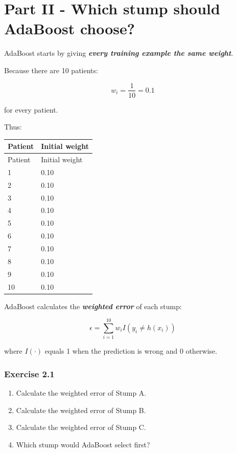 \documentclass{course_sheet}
\begin{document}
\section*{Part II - Which stump should AdaBoost choose?}
AdaBoost starts by giving \textbf{\textit{every training example the same weight}}.

Because there are 10 patients:

\[
w_i=\frac{1}{10}=0.1
\]

for every patient.

Thus:

\begingroup
\small
\setlength{\tabcolsep}{4pt}
\begin{longtable}{l|l}
Patient & Initial weight \\[1.5pt]
\hline
\endfirsthead
Patient & Initial weight \\[1.5pt]
\hline
\endhead
1 & 0.10 \\[1.5pt]
2 & 0.10 \\[1.5pt]
3 & 0.10 \\[1.5pt]
4 & 0.10 \\[1.5pt]
5 & 0.10 \\[1.5pt]
6 & 0.10 \\[1.5pt]
7 & 0.10 \\[1.5pt]
8 & 0.10 \\[1.5pt]
9 & 0.10 \\[1.5pt]
10 & 0.10 \\[1.5pt]
\end{longtable}
\endgroup
AdaBoost calculates the \textbf{\textit{weighted error}} of each stump:

\[
\epsilon
=
\sum_{i=1}^{10}
w_i I(y_i\neq h(x_i))
\]

where $I(\cdot)$ equals 1 when the prediction is wrong and 0 otherwise.

\subsubsection*{Exercise 2.1}
\begin{enumerate}
\item
Calculate the weighted error of Stump A.

\item
Calculate the weighted error of Stump B.

\item
Calculate the weighted error of Stump C.

\item
Which stump would AdaBoost select first?

\end{enumerate}
\clearpage
\end{document}

